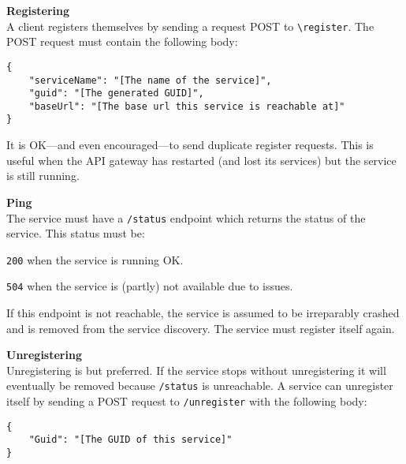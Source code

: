 \begin{teenumerate}
    \item \textbf{Registering}\\
    A client registers themselves by sending a request POST to \texttt{\textbackslash{}register}. The POST request must contain the following body:
    \begin{lstlisting}[style=teunknown]
{
    "serviceName": "[The name of the service]",
    "guid": "[The generated GUID]",
    "baseUrl": "[The base url this service is reachable at]"
}
    \end{lstlisting}
    It is OK---and even encouraged---to send duplicate register requests. This is useful when the API gateway has restarted (and lost its services) but the service is still running.
    \item \textbf{Ping}\\
    The service must have a \texttt{/status} endpoint which returns the status of the service. This status must be:
    \begin{teitemize}
        \item \texttt{200} when the service is running OK.
        \item \texttt{504} when the service is (partly) not available due to issues.
    \end{teitemize} 
    If this endpoint is not reachable, the service is assumed to be irreparably crashed and is removed from the service discovery. The service must register itself again.
    \item \textbf{Unregistering}\\
    Unregistering is  but preferred. If the service stops without unregistering it will eventually be removed because \texttt{/status} is unreachable. A service can unregister itself by sending a POST request to \texttt{/unregister} with the following body:
    \begin{lstlisting}[style=teunknown]
{
    "Guid": "[The GUID of this service]"
}
    \end{lstlisting} 
\end{teenumerate}